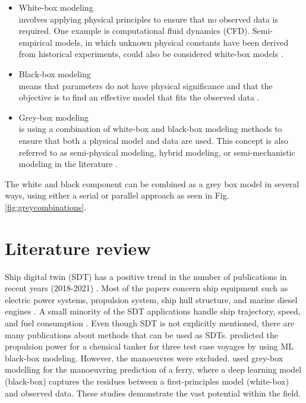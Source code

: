 \begin{itemize}
    \item White-box modeling \\
    involves applying physical principles to ensure that no observed data is required. One example is computational fluid dynamics (CFD). Semi-empirical models, in which unknown physical constants have been derived from historical experiments, could also be considered white-box models \cite{leifsson_grey-box_2008}.  

    \item Black-box modeling \\
    means that parameters do not have physical significance and that the objective is to find an effective model that fits the observed data \cite{lindskog_tools_1995}.
    
    \item Grey-box modeling \\
    is using a combination of white-box and black-box modeling methods to ensure that both a physical model and data are used. This concept is also referred to as semi-physical modeling, hybrid modeling, or semi-mechanistic modeling in the literature \cite{leifsson_grey-box_2008}. 
\end{itemize}

\noindent The white and black component can be combined as a grey box model in several ways, using either a serial or parallel approach \cite{leifsson_grey-box_2008} as seen in Fig.\ref{fig:greycombinations}. 



\section{Literature review}
Ship digital twin (SDT) has a positive trend in the number of publications in recent years (2018-2021)  \cite{assani_ships_2022}. Most of the papers concern ship equipment such as electric power systems, propulsion system, ship hull structure, and marine diesel engines \cite{assani_ships_2022}. A small minority of the SDT applications handle ship trajectory, speed, and fuel consumption \cite{assani_ships_2022}.   
Even though SDT is not explicitly mentioned, there are many publications about methods that can be used as SDTs. \textcite{lang_comparison_2022} predicted the propulsion power for a chemical tanker for three test case voyages by using ML black-box modeling. However, the manoeuvres were excluded. \textcite{nielsen_machine_2022} used grey-box modelling for the manoeuvring prediction of a ferry, where a deep learning model (black-box) captures the residues between a first-principles model (white-box) and observed data. These studies demonstrate the vast potential within the field.

